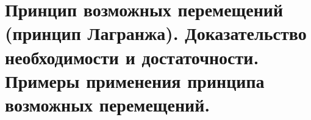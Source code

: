 \chapter{Принцип возможных перемещений (принцип Лагранжа). Доказательство
необходимости и достаточности. Примеры применения принципа возможных
перемещений.}

\newpage %
